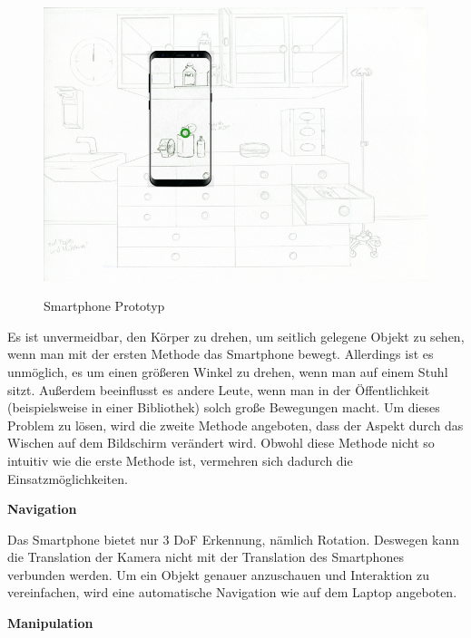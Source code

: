 \begin{figure}[ht]
\vspace*{1em}
\centering
\caption{Smartphone Prototyp}
\includegraphics[width=\textwidth]{images/paperPrototypewiths8mini.png}
\label{fig:paperPrototypewiths8mini} 
\end{figure}

  Es ist unvermeidbar, den Körper zu drehen, um seitlich gelegene Objekt zu sehen, wenn man mit der ersten Methode das Smartphone bewegt. Allerdings ist es unmöglich, es um einen größeren Winkel zu drehen, wenn man auf einem Stuhl sitzt. Außerdem beeinflusst es andere Leute, wenn man in der Öffentlichkeit (beispielsweise in einer Bibliothek) solch große Bewegungen macht. Um dieses Problem zu lösen, wird die zweite Methode angeboten, dass der Aspekt durch das Wischen auf dem Bildschirm verändert wird. Obwohl diese Methode nicht so intuitiv wie die erste Methode ist, vermehren sich dadurch die Einsatzmöglichkeiten.
  
  \vspace{1em}
  \noindent
  \textbf{Navigation}
  \vspace{1em}
  
  \noindent
  Das Smartphone bietet nur 3 DoF Erkennung, nämlich Rotation. Deswegen kann die Translation der Kamera nicht mit der Translation des Smartphones verbunden werden. Um ein Objekt genauer anzuschauen und Interaktion zu vereinfachen, wird eine automatische Navigation wie auf dem Laptop angeboten.
  
  \vspace{1em}
  \noindent
  \textbf{Manipulation}
  \vspace{1em}
  
